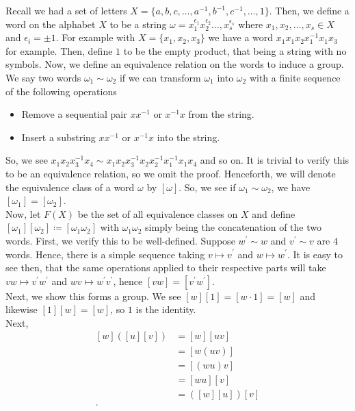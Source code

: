 Recall we had a set of letters \(X = \{a, b, c, \ldots, a^{-1}, b^{-1}, c^{-1}, \ldots,  1 \}\). Then, we define a word on the alphabet \(X\) to be a string \(\omega = x_1^{\epsilon_1} x_2^{\epsilon_2} \ldots, x_{s}^{\epsilon_{s}}\) where \(x_1, x_2, \ldots, x_{s} \in X\) and \(\epsilon _{i} = \pm 1\). For example with \(X = \{x_1, x_2, x_3\} \) we have a word \(x_1 x_1 x_2 x_1^{-1} x_1 x_3\) for example. Then, define \(1\) to be the empty product, that being a string with no symbols. Now, we define an equivalence relation on the words to induce a group.\\
We say two words \(\omega_1 \sim \omega_2\) if we can transform \(\omega_1\) into \(\omega_2\) with a finite sequence of the following operations
\begin{itemize}
	\item Remove a sequential pair \(x x^{-1}\) or \(x^{-1} x\) from the string.
	\item Insert a substring \(x x^{-1}\) or \(x^{-1} x\) into the string.
\end{itemize}
So, we see \(x_1x_2x_3^{-1}x_4 \sim x_1x_2x_3^{-1}x_2x_2^{-1} x_1^{-1} x_1 x_4\) and so on. It is trivial to verify this to be an equivalence relation, so we omit the proof. Henceforth, we will denote the equivalence class of a word \(\omega\) by \(\left[ \omega \right] \). So, we see if \( \omega_1 \sim \omega_2\), we have \(\left[ \omega_1 \right]  = \left[ \omega_2 \right] \).\\
Now, let \(F\left( X \right) \) be the set of all equivalence classes on \(X\) and define \(\left[ \omega_1 \right] \left[ \omega_2 \right]  \coloneqq \left[ \omega_1\omega_2 \right]  \) with \(\omega_1 \omega_2\) simply being the concatenation of the two words. First, we verify this to be well-defined. Suppose \(w^{\prime} \sim w\) and \(v^{\prime} \sim v\) are \(4\) words. Hence, there is a simple sequence taking \(v \mapsto v^{\prime}\) and \(w \mapsto w^{\prime}\). It is easy to see then, that the same operations applied to their respective parts will take \(vw \mapsto v^{\prime} w^{\prime}\) and \(wv \mapsto w^{\prime} v^{\prime}\), hence \(\left[ vw \right]  = \left[ v^{\prime} w^{\prime} \right] \).\\
Next, we show this forms a group. We see \(\left[ w \right] \left[ 1 \right]  = \left[ w \cdot 1 \right] = \left[ w \right]  \) and likewise \(\left[ 1 \right] \left[ w \right] = \left[ w \right] \), so \(1\) is the identity.\\
Next,
\begin{align*}
	\left[ w \right] \left( \left[ u \right] \left[ v \right]  \right) &=  \left[ w \right] \left[ uv \right]  \\
									   &= \left[ w(uv) \right]  \\
	&= \left[ \left( wu \right) v \right]  \\
	&= \left[ wu \right] \left[ v \right]  \\
	&= \left( \left[ w \right] \left[ u \right]  \right) \left[ v \right]  \\
.\end{align*}

